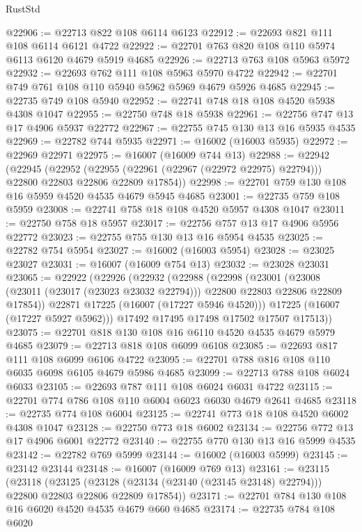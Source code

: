 \begin{lexlean}{RustStd}
\begin{coremodule}
@22906 := @22713 @822 @108 @6114 @6123
@22912 := @22693 @821 @111 @108 @6114 @6121 @4722
@22922 := @22701 @763 @820 @108 @110 @5974 @6113 @6120 @4679 @5919 @4685
@22926 := @22713 @763 @108 @5963 @5972
@22932 := @22693 @762 @111 @108 @5963 @5970 @4722
@22942 := @22701 @749 @761 @108 @110 @5940 @5962 @5969 @4679 @5926 @4685
@22945 := @22735 @749 @108 @5940
@22952 := @22741 @748 @18 @108 @4520 @5938 @4308 @1047
@22955 := @22750 @748 @18 @5938
@22961 := @22756 @747 @13 @17 @4906 @5937 @22772
@22967 := @22755 @745 @130 @13 @16 @5935 @4535
@22969 := @22782 @744 @5935
@22971 := @16002 (@16003 @5935)
@22972 := @22969 @22971
@22975 := @16007 (@16009 @744 @13)
@22988 := @22942
    (@22945
      (@22952 (@22955 (@22961 (@22967 (@22972 @22975) @22794))) @22800 @22803 @22806 @22809 @17854))
@22998 := @22701 @759 @130 @108 @16 @5959 @4520 @4535 @4679 @5945 @4685
@23001 := @22735 @759 @108 @5959
@23008 := @22741 @758 @18 @108 @4520 @5957 @4308 @1047
@23011 := @22750 @758 @18 @5957
@23017 := @22756 @757 @13 @17 @4906 @5956 @22772
@23023 := @22755 @755 @130 @13 @16 @5954 @4535
@23025 := @22782 @754 @5954
@23027 := @16002 (@16003 @5954)
@23028 := @23025 @23027
@23031 := @16007 (@16009 @754 @13)
@23032 := @23028 @23031
@23065 := @22922
    (@22926
      (@22932
        (@22988
          (@22998
            (@23001
              (@23008 (@23011 (@23017 (@23023 @23032 @22794))) @22800 @22803 @22806 @22809 @17854))
            @22871
            @17225
            (@16007 (@17227 @5946 @4520)))
          @17225
          (@16007 (@17227 @5927 @5962)))
        @17492
        @17495
        @17498
        @17502
        @17507
        @17513))
@23075 := @22701 @818 @130 @108 @16 @6110 @4520 @4535 @4679 @5979 @4685
@23079 := @22713 @818 @108 @6099 @6108
@23085 := @22693 @817 @111 @108 @6099 @6106 @4722
@23095 := @22701 @788 @816 @108 @110 @6035 @6098 @6105 @4679 @5986 @4685
@23099 := @22713 @788 @108 @6024 @6033
@23105 := @22693 @787 @111 @108 @6024 @6031 @4722
@23115 := @22701 @774 @786 @108 @110 @6004 @6023 @6030 @4679 @2641 @4685
@23118 := @22735 @774 @108 @6004
@23125 := @22741 @773 @18 @108 @4520 @6002 @4308 @1047
@23128 := @22750 @773 @18 @6002
@23134 := @22756 @772 @13 @17 @4906 @6001 @22772
@23140 := @22755 @770 @130 @13 @16 @5999 @4535
@23142 := @22782 @769 @5999
@23144 := @16002 (@16003 @5999)
@23145 := @23142 @23144
@23148 := @16007 (@16009 @769 @13)
@23161 := @23115
    (@23118
      (@23125 (@23128 (@23134 (@23140 (@23145 @23148) @22794))) @22800 @22803 @22806 @22809 @17854))
@23171 := @22701 @784 @130 @108 @16 @6020 @4520 @4535 @4679 @660 @4685
@23174 := @22735 @784 @108 @6020

\end{coremodule}
\end{lexlean}
